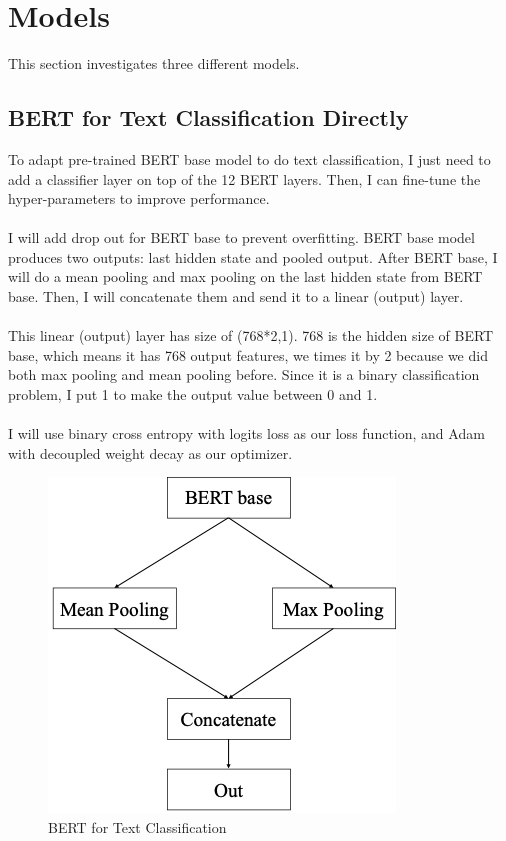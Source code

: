 \documentclass[11pt,a4paper]{article}
\begin{document}
\section{Models}

This section  investigates three different models.\\

\subsection{BERT for Text Classification Directly}

To adapt pre-trained BERT base model to do text classification, I just need to add a classifier layer on top of the 12 BERT layers. Then, I can fine-tune the hyper-parameters to improve performance.\\
\\
I will add drop out for BERT base to prevent overfitting. BERT base model produces two outputs: last hidden state and pooled output. After BERT base, I will do a mean pooling and max pooling on the last hidden state from BERT base. Then, I will concatenate them and send it to a linear (output) layer. \\
\\
This linear (output) layer has size of (768*2,1). 768 is the hidden size of BERT base, which means it has 768 output features, we times it by 2 because we did both max pooling and mean pooling before. Since it is a binary classification problem, I put 1 to make the output value between 0 and 1.\\
\\
I will use binary cross entropy with logits loss as our loss function, and Adam with decoupled weight decay\cite{weight} as our optimizer.\\

\begin{figure}[!htbp]
	\centering
	\includegraphics{figures/figure4.png}
	\caption{\label{fig:my-label} BERT for Text Classification}
\end{figure}
\end{document}
